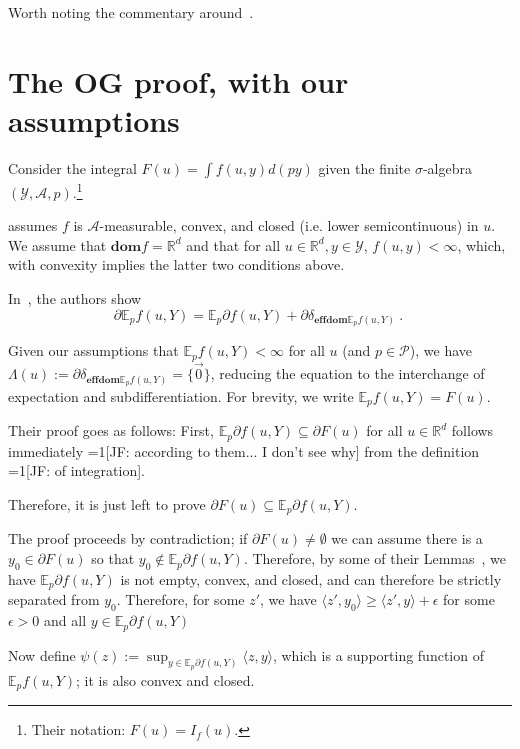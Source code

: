 \documentclass[12pt]{article}
\newcommand{\Comments}{1}
\newcommand{\mynote}[2]{\ifnum\Comments=1\textcolor{#1}{#2}\fi}
\newcommand{\jessie}[1]{\mynote{green!75!black}{[JF: #1]}}
\newcommand{\reals}{\mathbb{R}}
\newcommand{\A}{\mathcal{A}}
\newcommand{\E}{\mathbb{E}}
\renewcommand{\P}{\mathcal{P}}
\newcommand{\Y}{\mathcal{Y}}
\newcommand{\dom}{\mathbf{dom}}
\newcommand{\effdom}{\mathbf{effdom}}
\begin{document}
Worth noting the commentary around~\cite[Equation 7]{ioffe1969minimization}.


\section{The OG proof, with our assumptions}
Consider the integral $F(u) = \int f(u,y) d(py)$ given the finite $\sigma$-algebra $(\Y, \A, p)$.\footnote{Their notation: $F(u) = I_f(u)$.}

\cite{ioffe1969minimization} assumes $f$ is $\A$-measurable, convex, and closed (i.e. lower semicontinuous) in $u$.
We assume that $\dom f = \reals^d$ and that for all $u \in \reals^d,y \in \Y$, $f(u,y) < \infty$, which, with convexity implies the latter two conditions above.

In~\cite[Equation 7]{ioffe1969minimization}, the authors show 
\begin{equation}
\partial \E_p f(u,Y) = \E_p \partial f(u,Y) + \partial \delta_{\effdom \E_p f(u,Y)}~.~
\end{equation}

Given our assumptions that $\E_p f(u,Y) < \infty$ for all $u$ (and $p \in \P$), we have $\Lambda(u) := \partial \delta_{\effdom \E_p f(u,Y)} = \{\vec 0\}$, reducing the equation to the interchange of expectation and subdifferentiation.
For brevity, we write $\E_p f(u,Y) = F(u)$.

Their proof goes as follows:
First, $\E_p \partial f(u,Y) \subseteq \partial F(u)$ for all $u \in \reals^d$ follows immediately \jessie{according to them... I don't see why} from the definition \jessie{of integration}.%

Therefore, it is just left to prove $\partial F(u) \subseteq \E_p \partial f(u,Y)$.%

The proof proceeds by contradiction; if $\partial F(u) \neq \emptyset$ we can assume there is a $y_0 \in \partial F(u)$ so that $y_0 \not \in \E_p \partial f(u,Y)$.%
Therefore, by some of their Lemmas~\cite[Lemmas 1, 2]{ioffe1969minimization}, we have $\E_p \partial f(u,Y)$ is not empty, convex, and closed, and can therefore be strictly separated from $y_0$.
Therefore, for some $z'$, we have $\langle z', y_0 \rangle \geq \langle z', y \rangle + \epsilon$ for some $\epsilon > 0$ and all $y \in \E_p \partial f(u,Y)$

Now define $\psi(z) := \sup_{y \in \E_p \partial f(u,Y)} \langle z,y \rangle$, which is a supporting function of $\E_p f(u,Y)$; it is also convex and closed.
\end{document}
